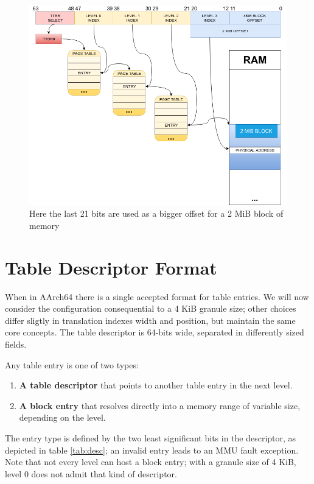 \documentclass[12pt,a4paper,openright,twoside]{report}
\begin{document}
 \begin{figure}[h]
 \includegraphics[scale=0.48]{images/tesi16.png} 
 \caption[Address Translation Example]{ Here the last 21 bits are
 used as a bigger offset for a 2 MiB block of memory}\label{fig:translation2}
 \end{figure}

\section{Table Descriptor Format}
When in AArch64 there is a single accepted format for table entries. We will now
consider the configuration consequential to a 4 KiB granule size; other choices
differ sligtly in translation indexes width and position, but maintain the same
core concepts. The table descriptor is 64-bits wide, separated in differently sized
 fields.

Any table entry is one of two types:
\begin{enumerate}
    \item \textbf{A table descriptor} that points to another table entry in the 
        next level.
    \item \textbf{A block entry} that resolves directly into a memory range of 
        variable size, depending on the level.
\end{enumerate}

The entry type is defined by the two least significant bits in the descriptor, 
as depicted in table \ref{tab:desc}; an invalid entry leads to an MMU fault exception.
Note that not every level can host a block entry; with a granule size of 4 KiB, 
level 0 does not admit that kind of descriptor.
\end{document}
